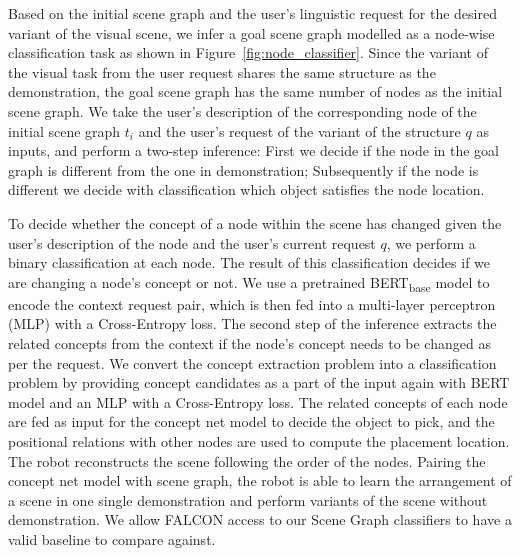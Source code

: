 Based on the initial scene graph and the user's linguistic request for the desired variant of the visual scene, we infer a goal scene graph modelled as a node-wise classification task as shown in Figure~\ref{fig:node_classifier}.
Since the variant of the visual task from the user request shares the same structure as the demonstration, the goal scene graph has the same number of nodes as the initial scene graph.
We take the user's description of the corresponding node of the initial scene graph $t_i$ and the user's request of the variant of the structure $q$ as inputs, and perform a two-step inference: First we decide if the node in the goal graph is different from the one in demonstration; Subsequently if the node is different we decide with classification which object satisfies the node location.


To decide whether the concept of a node within the scene has changed given the user's description of the node and the user's current request $q$, we perform a binary classification at each node. The result of this classification decides if we are changing a node's concept or not. 
We use a pretrained BERT\textsubscript{base} model to encode the context request pair, which is then fed into a multi-layer perceptron (MLP) with a Cross-Entropy loss.
The second step of the inference extracts the related concepts from the context if the node's concept needs to be changed as per the request.
We convert the concept extraction problem into a classification problem by providing concept candidates as a part of the input again with BERT model and an MLP with a Cross-Entropy loss.
The related concepts of each node are fed as input for the concept net model to decide the object to pick, and the positional relations with other nodes are used to compute the placement location.
The robot reconstructs the scene following the order of the nodes.
Pairing the concept net model with scene graph, the robot is able to learn the arrangement of a scene in one single demonstration and perform variants of the scene without demonstration. We allow FALCON access to our Scene Graph classifiers to have a valid baseline to compare against. 



